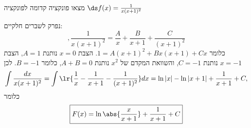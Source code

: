 מצאו פונקציה קדומה לפונקציה
$\ds f(x)=\frac{1}{x(x + 1)^2}$
\begin{solbox}
\unverified
נפרק לשברים חלקיים:
$$,\frac{1}{x(x+1)^2}=\frac{A}{x}+\frac{B}{x+1}+\frac{C}{(x+1)^2}$$
כלומר
$1=A(x+1)^2+Bx(x+1)+Cx$.
הצבת
$x=0$
נותנת
$A=1$,
הצבת
$x=-1$
נותנת
$C=-1$,
והשוואת המקדם של
$x^2$
נותנת
$A+B=0$,
כלומר
$B=-1$.
לכן
\begin{align*}
\int\frac{dx}{x(x+1)^2}=\int\lr{\frac1x-\frac{1}{x+1}-\frac{1}{(x+1)^2}}dx=\ln|x|-\ln|x+1|+\frac{1}{x+1}+C,
\end{align*}
כלומר
\begin{align*}
\boxed{F(x)=\ln\abs{\frac{x}{x+1}}+\frac{1}{x+1}+C}
\end{align*}
\end{solbox}
